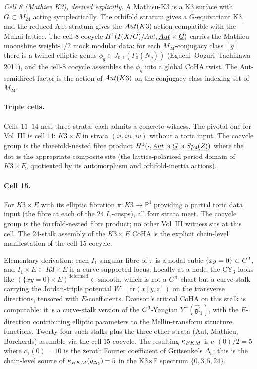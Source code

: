 \emph{Cell 8 (Mathieu K3), derived explicitly.} A Mathieu-K3 is a K3
surface with $G\subset M_{24}$ acting symplectically. The orbifold
stratum gives a $G$-equivariant K3, and the reduced Aut stratum gives
the $Aut(K3)$ action compatible with the Mukai lattice. The cell-$8$
cocycle
$H^{1}(I(X/G)/Aut,\underline{Aut}\rtimes\underline{G})$
carries the Mathieu moonshine weight-$1/2$ mock modular data: for
each $M_{24}$-conjugacy class $[g]$ there is a twined elliptic genus
$\phi_{g}\in J_{0,1}(\Gamma_{0}(N_{g}))$ (Eguchi--Ooguri--Tachikawa
2011), and the cell-$8$ cocycle assembles the $\phi_{g}$ into a
global CoHA twist. The Aut-semidirect factor is the action of
$Aut(K3)$ on the conjugacy-class indexing set of $M_{24}$.

\paragraph{Triple cells.} Cells $11$--$14$ nest three strata; each
admits a concrete witness. The pivotal one for Vol~III is cell $14$:
$K3\times E$ in strata $(ii,iii,iv)$ without a toric input. The
cocycle group is the threefold-nested fibre product
$H^{1}(\cdot,\underline{Aut}\rtimes\underline{G}\rtimes\underline{Sp_{4}(Z)})$
where the dot is the appropriate composite site (the lattice-polarised
period domain of $K3\times E$, quotiented by its automorphism and
orbifold-inertia actions).

\paragraph{Cell 15.} For $K3\times E$ with its elliptic fibration
$\pi:K3\to\mathbb{P}^{1}$ providing a partial toric data input (the
fibre at each of the $24$ $I_{1}$-cusps), all four strata meet. The
cocycle group is the fourfold-nested fibre product; no other Vol~III
witness sits at this cell. The $24$-stalk assembly of the $K3\times E$
CoHA is the explicit chain-level manifestation of the cell-15 cocycle.

Elementary derivation: each $I_{1}$-singular fibre of $\pi$ is a
nodal cubic $\{xy=0\}\subset C^{2}$, and $I_{1}\times E\subset
K3\times E$ is a curve-supported locus. Locally at a node, the CY$_3$
looks like $(\{xy=0\}\times E)^{\mathrm{deformed}}\subset\mathrm{smooth}$,
which is not a $C^{3}$-chart but a curve-stalk carrying the
Jordan-triple potential $W=\mathrm{tr}(x[y,z])$ on the transverse
directions, tensored with $E$-coefficients. Davison's critical CoHA
on this stalk is computable: it is a curve-stalk version of the
$C^{3}$-Yangian $Y^{+}(\widehat{\mathfrak{gl}}_{1})$, with the
$E$-direction contributing elliptic parameters to the Mellin-transform
structure functions. Twenty-four such stalks plus the three other
strata (Aut, Mathieu, Borcherds) assemble via the cell-$15$ cocycle.
The resulting $\kappa_{BKM}$ is $c_{1}(0)/2=5$ where $c_{1}(0)=10$ is the
zeroth Fourier coefficient of Gritsenko's $\Delta_{5}$; this is the
chain-level source of $\kappa_{BKM}(g_{\Delta_{5}})=5$ in the
K3$\times$E spectrum $\{0,3,5,24\}$.

